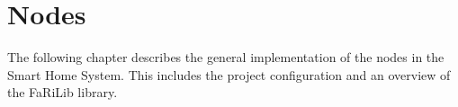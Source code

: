 \chapter{Nodes} \label{sec:nodes}
The following chapter describes the general implementation of the nodes in the 
Smart Home System. This includes the project configuration
and an overview of the FaRiLib library.







    
